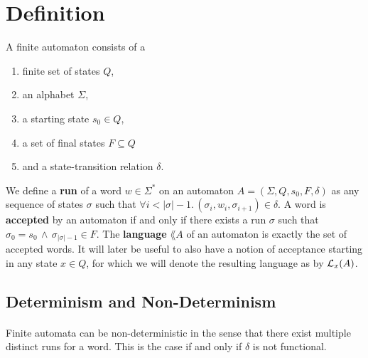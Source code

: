 \documentclass[11pt,a4paper,oneside]{book}
\begin{document}
        \section{Definition}
            A finite automaton consists of a 
            \begin{enumerate}
                \item
                    finite set of states $Q$, 
                \item 
                    an alphabet $\Sigma$, 
                \item 
                    a starting state $s_0 \in Q$, 
                \item 
                    a set of final states $F \subseteq Q$ 
                \item 
                    and a state-transition relation $\delta$. 
            \end{enumerate}

                We define a \textbf{run} of a word $w \in \Sigma^*$ on an automaton $A = (\Sigma, Q, s_0, F, \delta)$ as any sequence of states $\sigma$ such that $\forall i < \vert\sigma\vert-1. \, (\sigma_i, w_i, \sigma_{i+1}) \in \delta$.
            A word is \textbf{accepted} by an automaton if and only if there exists a run $\sigma$ such that $\sigma_0 = s_0 \, \wedge \, \sigma_{\vert\sigma\vert-1} \in F$. 
            The \textbf{language} $\lang{A}$ of an automaton is exactly the set of accepted words. It will later be useful to also have a notion of acceptance starting in any state $x \in Q$, for which we will denote the resulting language as by $\mathcal{L}_x(A)$.

            \subsection{Determinism and Non-Determinism}
                \paragraph{} 
                Finite automata can be non-deterministic in the sense that there exist multiple distinct runs for a word. This is the case if and only if $\delta$ is not functional. 

\end{document}
